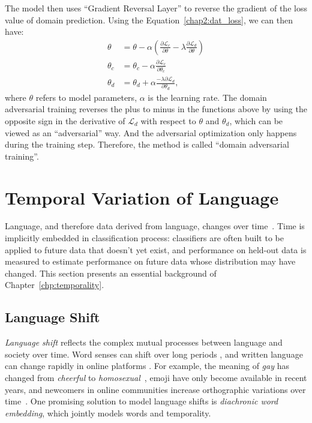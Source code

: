 The model then uses ``Gradient Reversal Layer'' to reverse the gradient of the loss value of domain prediction. 
Using the Equation~\ref{chap2:dat_loss}, we can then have:
\begin{align}
\theta &= \theta - \alpha \left( \frac{\partial \mathcal{L}_c}{\partial \theta} - \lambda \frac{\partial \mathcal{L}_d}{\partial \theta}  \right)\\
\theta_c &= \theta_c - \alpha \frac{\partial \mathcal{L}_c}{\partial \theta_c} \\
\theta_d &= \theta_d + \alpha \frac{- \lambda \partial \mathcal{L}_d}{\partial \theta_d},
\end{align}
where $\theta$ refers to model parameters, $\alpha$ is the learning rate.
The domain adversarial training reverses the plus to minus in the functions above by using the opposite sign in the derivative of $\mathcal{L}_d$ with respect to $\theta$ and $\theta_d$, which can be viewed as an ``adversarial'' way.
And the adversarial optimization only happens during the training step.
Therefore, the method is called ``domain adversarial training''. 


\section{Temporal Variation of Language}
\label{chap2:sec:time}

Language, and therefore data derived from language, changes over time~\cite{ullmann1963modern}.
Time is implicitly embedded in classification process: classifiers are often built to be applied to future data that doesn't yet exist, and performance on held-out data is measured to estimate performance on future data whose distribution may have changed.
This section presents an essential background of Chapter~\ref{chp:temporality}.


\subsection{Language Shift}

\textit{Language shift} reflects the complex mutual processes between language and society over time.
Word senses can shift over long periods \cite{hamilton2016diachronic}, and written language can change rapidly in online platforms \cite{eisenstein2014diffusion, goel2016social, stewart2017anorexia}.
For example, the meaning of \textit{gay} has changed from \textit{cheerful} to \textit{homosexual}~\cite{hamilton2016diachronic}, emoji have only become available in recent years, and newcomers in online communities increase orthographic variations over time~\cite{stewart2017anorexia, stewart2018making}. 
One promising solution to model language shifts is \textit{diachronic word embedding}, which jointly models words and temporality.


